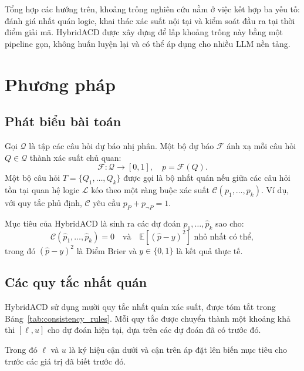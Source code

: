 \documentclass[pdflatex,sn-mathphys-num,oneside]{sn-jnl}
\begin{document}
Tổng hợp các hướng trên, khoảng trống nghiên cứu nằm ở việc kết hợp ba yếu tố: đánh giá nhất quán logic, khai thác xác suất nội tại và kiểm soát đầu ra tại thời điểm giải mã. HybridACD được xây dựng để lấp khoảng trống này bằng một pipeline gọn, không huấn luyện lại và có thể áp dụng cho nhiều LLM nền tảng.

\section{Phương pháp}\label{sec:method}

\subsection{Phát biểu bài toán}

Gọi $\mathcal{Q}$ là tập các câu hỏi dự báo nhị phân. Một bộ dự báo $\mathcal{F}$ ánh xạ mỗi câu hỏi $Q \in \mathcal{Q}$ thành xác suất chủ quan:
\begin{equation}
  \mathcal{F}: \mathcal{Q} \rightarrow [0,1], \quad p=\mathcal{F}(Q).
\end{equation}
Một bộ câu hỏi $T=\{Q_1,\ldots,Q_k\}$ được gọi là bộ nhất quán nếu giữa các câu hỏi tồn tại quan hệ logic $\mathcal{L}$ kéo theo một ràng buộc xác suất $\mathcal{C}(p_1,\ldots,p_k)$. Ví dụ, với quy tắc phủ định, $\mathcal{C}$ yêu cầu $p_P+p_{\neg P}=1$.

Mục tiêu của HybridACD là sinh ra các dự đoán $\hat{p}_1,\ldots,\hat{p}_k$ sao cho:
\begin{equation}
  \mathcal{C}(\hat{p}_1,\ldots,\hat{p}_k)=0
  \quad \text{và} \quad
  \mathbb{E}[(\hat{p}-y)^2] \text{ nhỏ nhất có thể},
\end{equation}
trong đó $(\hat{p}-y)^2$ là Điểm Brier và $y\in\{0,1\}$ là kết quả thực tế.

\subsection{Các quy tắc nhất quán}

HybridACD sử dụng mười quy tắc nhất quán xác suất, được tóm tắt trong Bảng~\ref{tab:consistency_rules}. Mỗi quy tắc được chuyển thành một khoảng khả thi $[\ell,u]$ cho dự đoán hiện tại, dựa trên các dự đoán đã có trước đó.

Trong đó $\ell$ và $u$ là ký hiệu cận dưới và cận trên áp đặt lên biến mục tiêu cho trước các giá trị đã biết trước đó.
\end{document}
